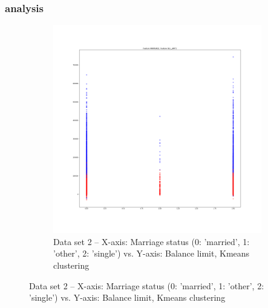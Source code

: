 \documentclass[
letterpaper, %
]{IEEEtran}
\begin{document}
	\subsubsection{analysis}
	\begin{figure}[ht]
		\begin{subfigure}{1.0\linewidth}
			\centering
			\includegraphics[width=\linewidth]{./images/ds2/clustering/kmeans/marriagelimitbal2.png}
			\caption{Data set 2 -- X-axis: Marriage status (0: 'married', 1: 'other', 2: 'single') vs. Y-axis: Balance limit, Kmeans clustering}
			\label{fig:kmeansds2}
		\end{subfigure}
	\end{figure}
\end{document}
